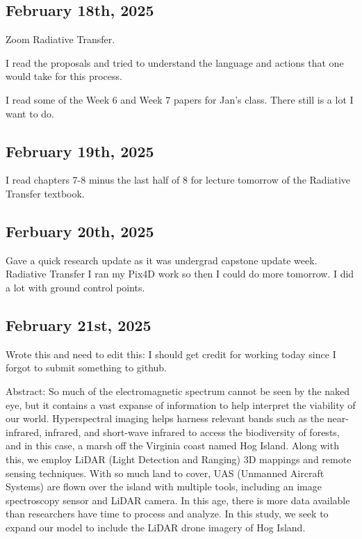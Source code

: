 \documentclass{article}
\begin{document}
\subsection{February 18th, 2025}
Zoom Radiative Transfer. 

I read the proposals and tried to understand the language and actions that one would take for this process. 

I read some of the Week 6 and Week 7 papers for Jan's class. 
There still is a lot I want to do. 

\subsection{February 19th, 2025}

I read chapters 7-8 minus the last half of 8 for lecture tomorrow of the Radiative Transfer textbook.


\subsection{Ferbuary 20th, 2025}
Gave a quick research update as it was undergrad capstone update week. 
Radiative Transfer I ran my Pix4D work so then I could do more tomorrow. 
I did a lot with ground control points. 


\subsection{February 21st, 2025}

Wrote this and need to edit this: I should get credit for working today since I forgot to submit something to github. 


Abstract:
So much of the electromagnetic spectrum cannot be seen by the naked eye, but it contains a vast expanse of information to help interpret the viability of our world. Hyperspectral imaging helps harness relevant bands such as the near-infrared, infrared, and short-wave infrared to access the biodiversity of forests, and in this case, a marsh off the Virginia coast named Hog Island. Along with this, we employ LiDAR (Light Detection and Ranging) 3D mappings and remote sensing techniques. 
With so much land to cover, UAS (Unmanned Aircraft Systems) are flown over the island with multiple tools, including an image spectroscopy sensor and LiDAR camera. In this age, there is more data available than researchers have time to process and analyze. In this study, we seek to expand our model to include the LiDAR drone imagery of Hog Island. 
\end{document}
